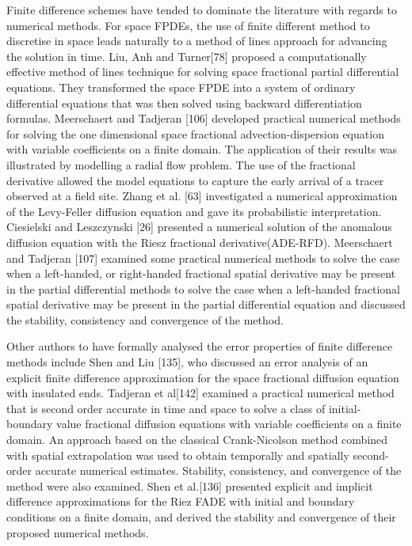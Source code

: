{Finite difference schemes have tended to dominate the literature with regards to numerical methods. For space FPDEs, the use of finite different method to discretise in space leads naturally to a method of lines approach for advancing the solution in time. Liu, Anh and Turner[78] proposed a computationally effective method of lines technique for solving space fractional partial differential equations. They transformed the space FPDE into a system of ordinary differential equations that was then solved using backward differentiation formulas. Meerschaert and Tadjeran [106] developed practical numerical methods for solving the one dimensional space fractional advection-dispersion equation with variable coefficients on a finite domain. The application of their results was illustrated by modelling a radial flow problem. The use of the fractional derivative allowed the model equations to capture the early arrival of a tracer observed at a field site. Zhang et al. [63] investigated a numerical approximation of the Levy-Feller diffusion equation and gave its probabilistic interpretation. Ciesielski and Leszczynski [26] presented a numerical solution of the anomalous diffusion equation with the Riesz fractional derivative(ADE-RFD). Meerschaert and Tadjeran [107] examined some practical numerical
methods to solve the case when a left-handed, or right-handed fractional spatial derivative may be present in the partial differential methods to solve the case when a left-handed fractional spatial derivative may be present in the partial differential equation and discussed the stability, consistency and convergence of the method.\

Other authors to have formally analysed the error properties of finite difference methods include Shen and Liu [135], who discussed an error analysis of an explicit finite difference approximation for the space fractional diffusion equation with insulated ends. Tadjeran et al[142] examined a practical numerical method that is second order accurate in time and space to solve a class of initial-boundary value fractional diffusion equations with variable coefficients on a finite domain. An approach based on the classical Crank-Nicolson method combined with spatial extrapolation was used to obtain temporally and spatially second-order accurate numerical estimates. Stability, consistency, and convergence of the method were also examined. Shen et al.[136] presented explicit and implicit difference approximations for the Riez FADE with initial and boundary conditions on a finite domain, and derived the stability and convergence of their proposed numerical methods.\

}
